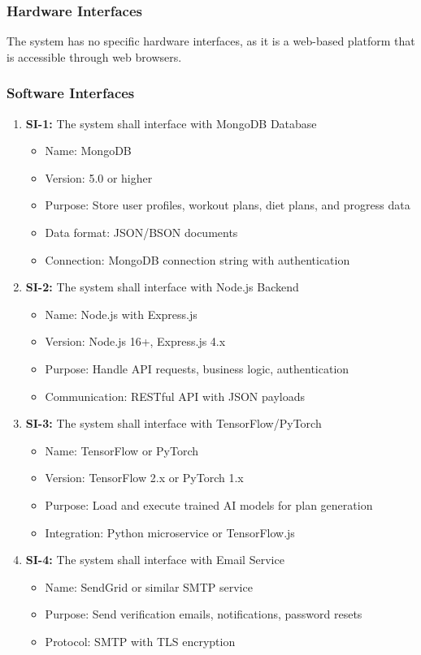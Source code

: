 \documentclass[12pt,a4paper]{article}
\begin{document}
\subsubsection{Hardware Interfaces}
The system has no specific hardware interfaces, as it is a web-based platform that is accessible through web browsers.
\subsubsection{Software Interfaces}
\begin{enumerate}
    \item \textbf{SI-1:} The system shall interface with MongoDB Database
    \begin{itemize}
        \item Name: MongoDB
        \item Version: 5.0 or higher
        \item Purpose: Store user profiles, workout plans, diet plans, and progress data
        \item Data format: JSON/BSON documents
        \item Connection: MongoDB connection string with authentication
    \end{itemize}
    
    \item \textbf{SI-2:} The system shall interface with Node.js Backend
    \begin{itemize}
        \item Name: Node.js with Express.js
        \item Version: Node.js 16+, Express.js 4.x
        \item Purpose: Handle API requests, business logic, authentication
        \item Communication: RESTful API with JSON payloads
    \end{itemize}
    
    \item \textbf{SI-3:} The system shall interface with TensorFlow/PyTorch
    \begin{itemize}
        \item Name: TensorFlow or PyTorch
        \item Version: TensorFlow 2.x or PyTorch 1.x
        \item Purpose: Load and execute trained AI models for plan generation
        \item Integration: Python microservice or TensorFlow.js
    \end{itemize}
    
    \item \textbf{SI-4:} The system shall interface with Email Service
    \begin{itemize}
        \item Name: SendGrid or similar SMTP service
        \item Purpose: Send verification emails, notifications, password resets
        \item Protocol: SMTP with TLS encryption
    \end{itemize}
\end{enumerate}
\end{document}
